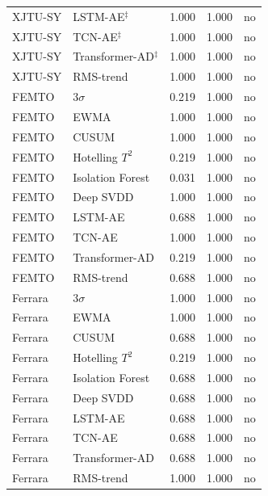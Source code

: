 \documentclass[journal]{IEEEtran}
\begin{document}
\begin{table}[t]
\begin{tabular}{@{}llccc@{}}
XJTU-SY & LSTM-AE$^\ddagger$        & 1.000 & 1.000 & no \\
XJTU-SY & TCN-AE$^\ddagger$         & 1.000 & 1.000 & no \\
XJTU-SY & Transformer-AD$^\ddagger$ & 1.000 & 1.000 & no \\
XJTU-SY & RMS-trend        & 1.000 & 1.000 & no \\
FEMTO   & 3$\sigma$        & 0.219 & 1.000 & no \\
FEMTO   & EWMA             & 1.000 & 1.000 & no \\
FEMTO   & CUSUM            & 1.000 & 1.000 & no \\
FEMTO   & Hotelling $T^2$  & 0.219 & 1.000 & no \\
FEMTO   & Isolation Forest & 0.031 & 1.000 & no \\
FEMTO   & Deep SVDD        & 1.000 & 1.000 & no \\
FEMTO   & LSTM-AE          & 0.688 & 1.000 & no \\
FEMTO   & TCN-AE           & 1.000 & 1.000 & no \\
FEMTO   & Transformer-AD   & 0.219 & 1.000 & no \\
FEMTO   & RMS-trend        & 0.688 & 1.000 & no \\
Ferrara & 3$\sigma$        & 1.000 & 1.000 & no \\
Ferrara & EWMA             & 1.000 & 1.000 & no \\
Ferrara & CUSUM            & 0.688 & 1.000 & no \\
Ferrara & Hotelling $T^2$  & 0.219 & 1.000 & no \\
Ferrara & Isolation Forest & 0.688 & 1.000 & no \\
Ferrara & Deep SVDD        & 0.688 & 1.000 & no \\
Ferrara & LSTM-AE          & 0.688 & 1.000 & no \\
Ferrara & TCN-AE           & 0.688 & 1.000 & no \\
Ferrara & Transformer-AD   & 0.688 & 1.000 & no \\
Ferrara & RMS-trend        & 1.000 & 1.000 & no \\
\bottomrule
\end{tabular}
\end{table}
\end{document}
